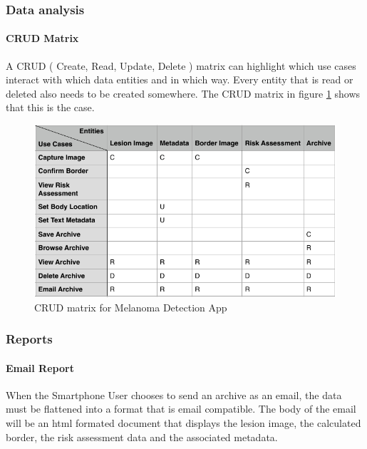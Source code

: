         \subsubsection{Data analysis}
            \paragraph{CRUD Matrix}

                A CRUD ( Create, Read, Update, Delete ) matrix can highlight which use cases interact with which data entities and in which way. Every entity that is read or deleted also needs to be created somewhere. The CRUD matrix in figure \ref{fig:crud} shows that this is the case.

                \begin{figure}[H]
                    \centering
                    \includegraphics[width=\textwidth]{assets/requirements/CRUD.pdf}
                    \caption{CRUD matrix for Melanoma Detection App}
                    \label{fig:crud}
                \end{figure}

        \subsubsection{Reports}
            \paragraph{Email Report}
                When the Smartphone User chooses to send an archive as an email, the data must be flattened into a format that is email compatible. The body of the email will be an html formated document that displays the lesion image, the calculated border, the risk assessment data and the associated metadata.


